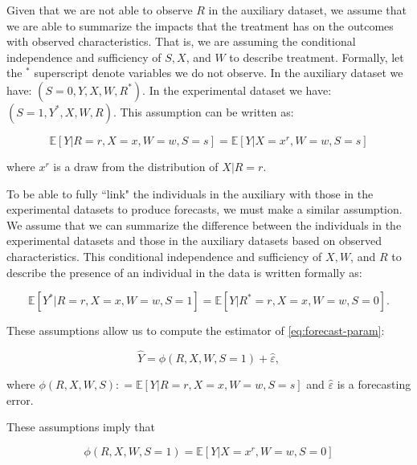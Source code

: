 Given that we are not able to observe $R$ in the auxiliary dataset, we assume that we are able to summarize the impacts that the treatment has on the outcomes with observed characteristics. That is, we are assuming the conditional independence and sufficiency of $S, X$, and $W$ to describe treatment. Formally, let the $^{*}$ superscript denote variables we do not observe. In the auxiliary dataset we have: $\left( S = 0, Y, X, W, R^* \right)$. In the experimental dataset we have: $\left( S = 1, Y^*, X, W, R \right)$. This assumption can be written as:

\begin{equation}
\mathbb{E} \left[ Y | R = r, X = x, W = w, S = s\right] =  \mathbb{E} \left[ Y | X = x^r, W = w, S = s\right]
\end{equation}

\noindent where $x^r$ is a draw from the distribution of $X | R = r$.

To be able to fully ``link" the individuals in the auxiliary with those in the experimental datasets to produce forecasts, we must make a similar assumption. We assume that we can summarize the difference between the individuals in the experimental datasets and those in the auxiliary datasets based on observed characteristics. This conditional independence and sufficiency of $X, W$, and $R$ to describe the presence of an individual in the data is written formally as:

\begin{equation}
\mathbb{E} \left[ Y^* | R = r, X = x, W = w, S = 1 \right] = \mathbb{E} \left[ Y | R^* = r , X = x, W = w, S = 0\right].
\end{equation}

These assumptions allow us to compute the estimator of \eqref{eq:forecast-param}: 

\begin{equation}
\widehat{Y} = \widehat{\phi} \left( R, X, W, S = 1 \right) + \widehat{\varepsilon},   \label{eq:additive}
\end{equation}

\noindent where $\phi \left( R, X, W, S \right) : = \mathbb{E} \left[ Y | R = r, X = x, W = w, S = s \right] $ and $\widehat{\varepsilon}$ is a forecasting error. 

These assumptions imply that

\begin{equation}
\phi \left( R, X, W, S = 1 \right) = \mathbb{E} \left[ Y | X = x^r, W = w, S = 0 \right]
\end{equation}

